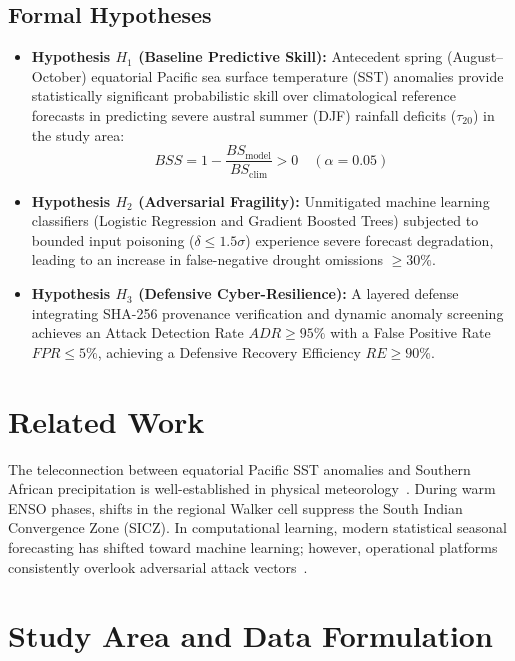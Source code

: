 \documentclass[runningheads]{llncs}
\begin{document}
\subsection{Formal Hypotheses}
\begin{itemize}
    \item \textbf{Hypothesis $H_1$ (Baseline Predictive Skill):} Antecedent spring (August--October) equatorial Pacific sea surface temperature (SST) anomalies provide statistically significant probabilistic skill over climatological reference forecasts in predicting severe austral summer (DJF) rainfall deficits ($\tau_{20}$) in the study area:
    \begin{equation}
        BSS = 1 - \frac{BS_{\text{model}}}{BS_{\text{clim}}} > 0 \quad (\alpha = 0.05)
    \end{equation}
    \item \textbf{Hypothesis $H_2$ (Adversarial Fragility):} Unmitigated machine learning classifiers (Logistic Regression and Gradient Boosted Trees) subjected to bounded input poisoning ($\delta \le 1.5\sigma$) experience severe forecast degradation, leading to an increase in false-negative drought omissions $\ge 30\%$.
    \item \textbf{Hypothesis $H_3$ (Defensive Cyber-Resilience):} A layered defense integrating SHA-256 provenance verification and dynamic anomaly screening achieves an Attack Detection Rate $ADR \ge 95\%$ with a False Positive Rate $FPR \le 5\%$, achieving a Defensive Recovery Efficiency $RE \ge 90\%$.
\end{itemize}

\section{Related Work}
The teleconnection between equatorial Pacific SST anomalies and Southern African precipitation is well-established in physical meteorology~\cite{ropelewski1987global,reason2000enso,landman2012multi}. During warm ENSO phases, shifts in the regional Walker cell suppress the South Indian Convergence Zone (SICZ). In computational learning, modern statistical seasonal forecasting has shifted toward machine learning; however, operational platforms consistently overlook adversarial attack vectors~\cite{biggio2018wild,barreno2010security}.

\section{Study Area and Data Formulation}
\end{document}
